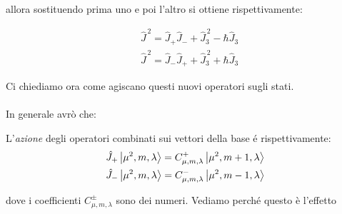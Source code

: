 \begin{myprf}
	allora sostituendo prima uno e poi l'altro si ottiene rispettivamente:
	
\begin{align*}
	& \hat{J}^{\, 2} = \hat{J}_+ \hat{J}_- + \hat{J}^{\, 2}_3 - \hbar \hat{J}_3 \\
	&  \hat{J}^{\, 2} = \hat{J}_- \hat{J}_+ + \hat{J}^{\, 2}_3 + \hbar \hat{J}_3
\end{align*}






	
\end{myprf}

	Ci chiediamo ora come agiscano questi nuovi operatori sugli stati.
	\\
	\\
	In generale avrò che:
	
\begin{nb}
	L'\textit{azione} degli operatori combinati sui vettori della base é rispettivamente:
\begin{align*}
	& \hat{J}_+ \ket{\mu^2, m, \lambda} = C^+_{\mu, m, \lambda} \ket{\mu^2, m+1, \lambda} \\
	& \hat{J}_- \ket{\mu^2, m, \lambda} = C^-_{\mu, m, \lambda} \ket{\mu^2, m-1, \lambda}
\end{align*}
\end{nb}
	
	dove i coefficienti $C^{\pm}_{\mu, m, \lambda}$ sono dei numeri. Vediamo perché questo è l'effetto
	
